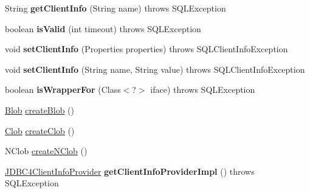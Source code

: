 \begin{DoxyCompactItemize}
String {\bfseries get\+Client\+Info} (String name)  throws S\+Q\+L\+Exception 
\item 
\mbox{\label{classcom_1_1mysql_1_1jdbc_1_1_j_d_b_c4_load_balanced_my_s_q_l_connection_a25d4ea57b1975d267f63da41eac40045}} 
boolean {\bfseries is\+Valid} (int timeout)  throws S\+Q\+L\+Exception 
\item 
\mbox{\label{classcom_1_1mysql_1_1jdbc_1_1_j_d_b_c4_load_balanced_my_s_q_l_connection_a50d5bcd9c19091973ea0bca7c2fae754}} 
void {\bfseries set\+Client\+Info} (Properties properties)  throws S\+Q\+L\+Client\+Info\+Exception 
\item 
\mbox{\label{classcom_1_1mysql_1_1jdbc_1_1_j_d_b_c4_load_balanced_my_s_q_l_connection_a3d2138f1115c52b70aad49581a1b2473}} 
void {\bfseries set\+Client\+Info} (String name, String value)  throws S\+Q\+L\+Client\+Info\+Exception 
\item 
\mbox{\label{classcom_1_1mysql_1_1jdbc_1_1_j_d_b_c4_load_balanced_my_s_q_l_connection_ac16a2b56aa8b3d4f8a8f0e2ee91a0c3e}} 
boolean {\bfseries is\+Wrapper\+For} (Class$<$?$>$ iface)  throws S\+Q\+L\+Exception 
\item 
\mbox{\hyperlink{classcom_1_1mysql_1_1jdbc_1_1_blob}{Blob}} \mbox{\hyperlink{classcom_1_1mysql_1_1jdbc_1_1_j_d_b_c4_load_balanced_my_s_q_l_connection_a342d16dc86c151ae426bfe6edaed7f5c}{create\+Blob}} ()
\item 
\mbox{\hyperlink{classcom_1_1mysql_1_1jdbc_1_1_clob}{Clob}} \mbox{\hyperlink{classcom_1_1mysql_1_1jdbc_1_1_j_d_b_c4_load_balanced_my_s_q_l_connection_a374317241c9e1702a2b090fad9777eae}{create\+Clob}} ()
\item 
N\+Clob \mbox{\hyperlink{classcom_1_1mysql_1_1jdbc_1_1_j_d_b_c4_load_balanced_my_s_q_l_connection_aa2fc0ccba4c551009e1cf5b38e06e7bd}{create\+N\+Clob}} ()
\item 
\mbox{\label{classcom_1_1mysql_1_1jdbc_1_1_j_d_b_c4_load_balanced_my_s_q_l_connection_a623432e47763367c15d439404aa9157e}} 
\mbox{\hyperlink{interfacecom_1_1mysql_1_1jdbc_1_1_j_d_b_c4_client_info_provider}{J\+D\+B\+C4\+Client\+Info\+Provider}} {\bfseries get\+Client\+Info\+Provider\+Impl} ()  throws S\+Q\+L\+Exception 
\end{DoxyCompactItemize}
